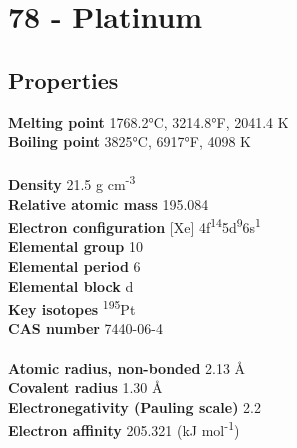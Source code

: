 \section{78 - Platinum}
\label{sec:elem-platinum}
\subsection{Properties}
\textbf{Melting point} 1768.2°C, 3214.8°F, 2041.4 K\\
\textbf{Boiling point} 3825°C, 6917°F, 4098 K\\
\\
\textbf{Density} 21.5 g cm\textsuperscript{-3}\\
\textbf{Relative atomic mass} 195.084\\
\textbf{Electron configuration} [Xe] 4f\textsuperscript{14}5d\textsuperscript{9}6s\textsuperscript{1}\\
\textbf{Elemental group} 10\\
\textbf{Elemental period} 6\\
\textbf{Elemental block} d\\
\textbf{Key isotopes} \textsuperscript{195}Pt\\
\textbf{CAS number} 7440-06-4\\
\\
\textbf{Atomic radius, non-bonded} 2.13 Å\\
\textbf{Covalent radius} 1.30 Å\\
\textbf{Electronegativity (Pauling scale)} 2.2\\
\textbf{Electron affinity} 205.321 (kJ mol\textsuperscript{-1})\\